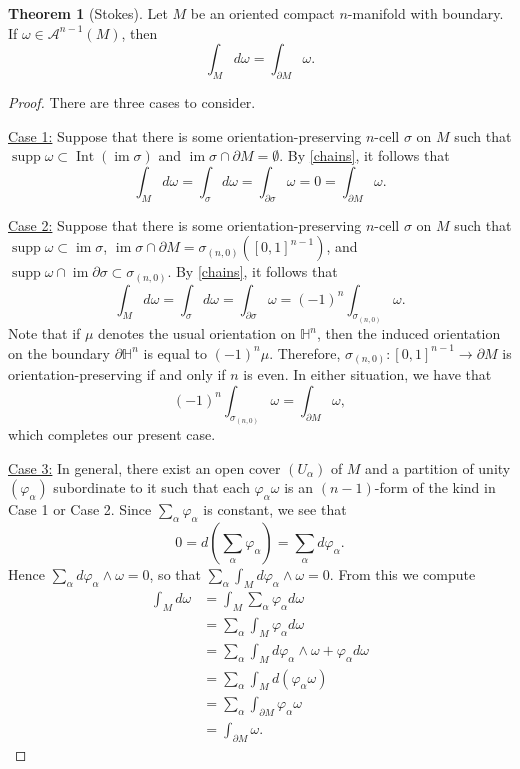 \documentclass[10pt,letterpaper,cm]{nupset}
\theoremstyle{definition}
\theoremstyle{theorem}
\newtheorem{theorem}[definition]{Theorem}
\theoremstyle{remark}
\renewcommand{\H}{\mathbb H}
\newcommand{\1}{\mathbf{1}}
\newcommand{\0}{\vec 0}
\DeclareMathOperator{\im}{im}
\DeclareMathOperator{\Int}{Int}
\DeclareMathOperator{\supp}{supp}
\begin{document}
\begin{theorem}[Stokes]\label{stokes}
Let $M$ be an oriented compact $n$-manifold with boundary. If $\omega \in \mathcal{A}^{n-1}(M)$, then $$ \int_M d\omega = \int_{\partial{M}} \omega  .$$
\end{theorem}
\begin{proof} There are three cases to consider.

\medskip


\underline{Case 1:} Suppose that there is some orientation-preserving $n$-cell $\sigma$ on $M$ such that $\supp \omega \subset \Int(\im \sigma)$ and $\im \sigma \cap \partial{M} =\emptyset$. By \cref{chains}, it follows that $$\int_M d\omega  = \int_{\sigma} d\omega = \int_{\partial{\sigma}} \omega = 0 = \int_{\partial{M}} \omega    .$$

\medskip


\underline{Case 2:} Suppose that there is some orientation-preserving $n$-cell $\sigma$ on $M$ such that $\supp \omega \subset  \im \sigma$, $\im \sigma \cap \partial{M} =\sigma_{(n,0)}\left(\left[0,1\right]^{n-1}\right)$, and $\supp \omega \cap \im \partial{\sigma} \subset \sigma_{(n,0)}$. By \cref{chains}, it follows that $$\int_M d\omega  = \int_{\sigma} d\omega = \int_{\partial{\sigma}} \omega = ({-1})^n \int_{\sigma_{(n,0)}} \omega .$$ Note that if $\mu$ denotes the usual orientation on $\H^n$, then the induced orientation on the boundary $\partial{\H^n}$ is equal to $\left({-1}\right)^n \mu$. Therefore, $\sigma_{(n,0)} : \left[0,1\right]^{n-1}\to \partial{M}$ is orientation-preserving  if and only if $n$ is even. In either situation, we have that $$\left({-1}\right)^n \int_{\sigma_{(n,0)}} \omega = \int_{\partial{M}} \omega  ,$$ which completes our present case.

\medskip


\underline{Case 3:} In general, there exist an open cover $\left(U_{\alpha}\right)$ of $M$ and a partition of unity $\left(\varphi_{\alpha}\right)$ subordinate to it such that each $\varphi_{\alpha}\omega$ is an $\left(n-1\right)$-form of the kind in Case 1 or Case 2. Since $\sum_{\alpha} \varphi_{\alpha}$ is constant, we see that $$0 = d\left(\sum_{\alpha} \varphi_{\alpha} \right) = \sum_{\alpha} d \varphi_{\alpha}.$$ Hence $ \sum_{\alpha} d \varphi_{\alpha} \wedge \omega =0$, so that $\sum_{\alpha} \int_M d\varphi_{\alpha} \wedge \omega =0$. From this we compute
\begin{align*}
 \int_M d\omega & = \int_M \sum_{\alpha} \varphi_{\alpha} d\omega 
 \\ & = \sum_{\alpha}\int_M \varphi_{\alpha} d\omega
\\ & =  \sum_{\alpha}\int_M d\varphi_{\alpha} \wedge \omega + \varphi_{\alpha} d\omega 
\\ & =  \sum_{\alpha}\int_M d(\varphi_{\alpha} \omega)
\\ & = \sum_{\alpha} \int_{\partial{M}} \varphi_{\alpha} \omega 
\\ & =  \int_{\partial{M}} \omega .
\end{align*}
\end{proof}
\end{document}
